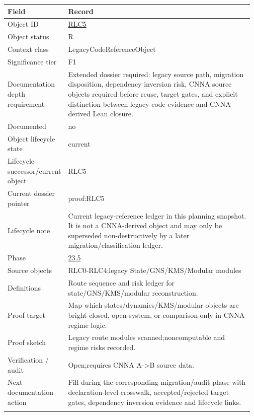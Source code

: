 \begin{longtable}{L{0.16\linewidth} L{0.81\linewidth}}
\hline
\textbf{Field} & \textbf{Record}\\
\hline
Object ID & \hyperlink{object-row-RLC5}{RLC5}\\
\hline\addlinespace[0.20em]
Object status & R\\
\hline\addlinespace[0.20em]
Context class & LegacyCodeReferenceObject\\
\hline\addlinespace[0.20em]
Significance tier & F1\\
\hline\addlinespace[0.20em]
Documentation depth requirement & Extended dossier required: legacy source path, migration disposition, dependency inversion risk, CNNA source objects required before reuse, target gates, and explicit distinction between legacy code evidence and CNNA-derived Lean closure.\\
\hline\addlinespace[0.20em]
Documented & no\\
\hline\addlinespace[0.20em]
Object lifecycle state & current\\
\hline\addlinespace[0.20em]
Lifecycle successor/\allowbreak{}current object & RLC5\\
\hline\addlinespace[0.20em]
Current dossier pointer & proof:RLC5\\
\hline\addlinespace[0.20em]
Lifecycle note & Current legacy-reference ledger in this planning snapshot. It is not a CNNA-derived object and may only be superseded non-destructively by a later migration/\allowbreak{}classification ledger.\\
\hline\addlinespace[0.20em]
Phase & \hyperlink{phase-row-23-5}{23.5}\\
\hline\addlinespace[0.20em]
Source objects & RLC0-RLC4;\newline legacy State/\allowbreak{}GNS/\allowbreak{}KMS/\allowbreak{}Modular modules\\
\hline\addlinespace[0.20em]
Definitions & Route sequence and risk ledger for state/\allowbreak{}GNS/\allowbreak{}KMS/\allowbreak{}modular reconstruction.\\
\hline\addlinespace[0.20em]
Proof target & Map which states/\allowbreak{}dynamics/\allowbreak{}KMS/\allowbreak{}modular objects are bright closed, open-system, or comparison-only in CNNA regime logic.\\
\hline\addlinespace[0.20em]
Proof sketch & Legacy route modules scanned;\newline noncomputable and regime risks recorded.\\
\hline\addlinespace[0.20em]
Verification /\allowbreak{} audit & Open;\newline requires CNNA A->B source data.\\
\hline\addlinespace[0.20em]
Next documentation action & Fill during the corresponding migration/\allowbreak{}audit phase with declaration-level crosswalk, accepted/\allowbreak{}rejected target gates, dependency inversion evidence and lifecycle links.\\
\hline\addlinespace[0.20em]
\end{longtable}

